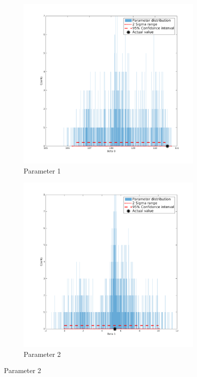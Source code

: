 \documentclass[11pt,a4paper,oneside]{report}
\begin{document}
\begin{figure}[H]
\centering
  \begin{subfigure}[b]{0.5\textwidth}
    \includegraphics[width=\textwidth, trim=0 0 0 0,clip=true]{figures/task5/parDistM3P1.png}
    \caption{Parameter 1}
  \end{subfigure}%
  \begin{subfigure}[b]{0.5\textwidth}
    \includegraphics[width=\textwidth, trim=0 0 0 0,clip=true]{figures/task5/parDistM3P2.png}
    \caption{Parameter 2}
  \end{subfigure}%
  

\end{figure}
\end{document}
